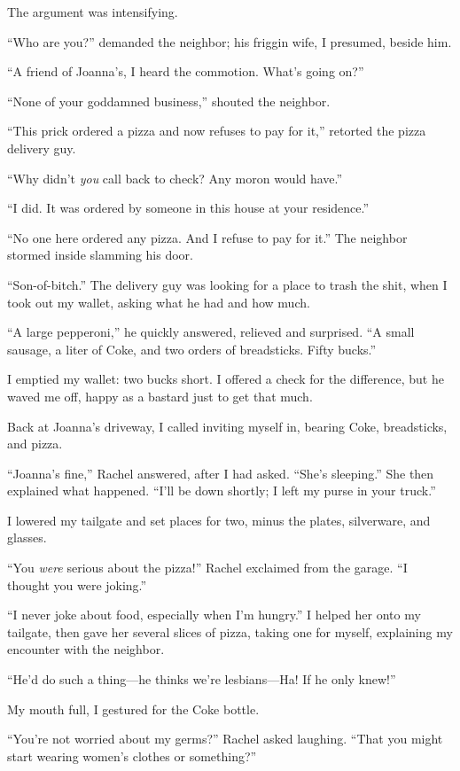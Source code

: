 The argument was intensifying.

``Who are you?'' demanded the neighbor; his friggin wife, I presumed,
beside him.

``A friend of Joanna's, I heard the commotion. What's going on?''

``None of your goddamned business,'' shouted the neighbor.

``This prick ordered a pizza and now refuses to pay for it,'' retorted
the pizza delivery guy.

``Why didn't \emph{you} call back to check? Any moron would have.''

``I did. It was ordered by someone in this house at your residence.''

``No one here ordered any pizza. And I refuse to pay for it.'' The
neighbor stormed inside slamming his door.

``Son-of-bitch.'' The delivery guy was looking for a place to trash the
shit, when I took out my wallet, asking what he had and how much.

``A large pepperoni,'' he quickly answered, relieved and surprised. ``A
small sausage, a liter of Coke, and two orders of breadsticks. Fifty
bucks.''

I emptied my wallet: two bucks short. I offered a check for the
difference, but he waved me off, happy as a bastard just to get that
much.

Back at Joanna's driveway, I called inviting myself in, bearing Coke,
breadsticks, and pizza.

``Joanna's fine,'' Rachel answered, after I had asked. ``She's
sleeping.'' She then explained what happened. ``I'll be down shortly; I
left my purse in your truck.''

I lowered my tailgate and set places for two, minus the plates,
silverware, and glasses.

``You \emph{were} serious about the pizza!'' Rachel exclaimed from the
garage. ``I thought you were joking.''

``I never joke about food, especially when I'm hungry.'' I helped her
onto my tailgate, then gave her several slices of pizza, taking one for
myself, explaining my encounter with the neighbor.

``He'd do such a thing---he thinks we're lesbians---Ha! If he only
knew!''

My mouth full, I gestured for the Coke bottle.

``You're not worried about my germs?'' Rachel asked laughing. ``That you
might start wearing women's clothes or something?''

